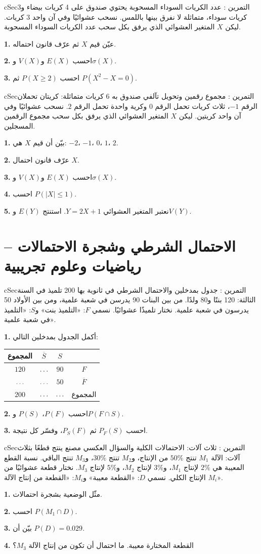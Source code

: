 \documentclass[12pt,a4paper]{article}
\newenvironment{BOX}[2]{\begin{otherlanguage}{english}\begin{arbox}{#1}{#2}}{\end{arbox}\end{otherlanguage}}
\newcounter{exo}
\newenvironment{tamrin}[1]{\stepcounter{exo}\begin{BOX}{cSec}{التمرين \theexo: #1}}{\end{BOX}}
\renewcommand{\ldots}{\mathinner{\ldotp\ldotp\ldotp}}
\newcommand{\QQ}[1]{\par\smallskip\textbf{#1.} }
\begin{document}
\begin{tamrin}{عدد الكريات السوداء المسحوبة}
يحتوي صندوق على 4 كريات بيضاء و3 كريات سوداء، متماثلة لا نفرق بينها باللمس. نسحب عشوائيًا وفي آن واحد 3 كريات. ليكن $X$ المتغير العشوائي الذي يرفق بكل سحب عدد الكريات السوداء المسحوبة.
\QQ{1} عيّن قيم $X$ ثم عرّف قانون احتماله.
\QQ{2} احسب $E(X)$ و$V(X)$ و$\sigma(X)$.
\QQ{3} احسب $P(X\geqslant2)$ ثم $P(X^2-X=0)$.
\end{tamrin}

\begin{tamrin}{مجموع رقمين وتحويل تآلفي}
صندوق به 6 كريات متماثلة: كريتان تحملان الرقم $-1$، ثلاث كريات تحمل الرقم $0$ وكرية واحدة تحمل الرقم $2$. نسحب عشوائيًا وفي آن واحد كريتين. ليكن $X$ المتغير العشوائي الذي يرفق بكل سحب مجموع الرقمين المسجلين.
\QQ{1} بيّن أن قيم $X$ هي: $-2$، $-1$، $0$، $1$، $2$.
\QQ{2} عرّف قانون احتمال $X$.
\QQ{3} احسب $E(X)$ و$V(X)$ و$\sigma(X)$.
\QQ{4} احسب $P(|X|\leqslant1)$.
\QQ{5} نعتبر المتغير العشوائي $Y=2X+1$. استنتج $E(Y)$ و$V(Y)$.
\end{tamrin}

\section{الاحتمال الشرطي وشجرة الاحتمالات -- رياضيات وعلوم تجريبية}

\begin{tamrin}{جدول بمدخلين والاحتمال الشرطي}
في ثانوية بها 200 تلميذ في السنة الثالثة: 120 بنتًا و80 ولدًا. من بين البنات 90 يدرسن في شعبة علمية، ومن بين الأولاد 50 يدرسون في شعبة علمية. نختار تلميذًا عشوائيًا. نسمي $F$: «التلميذ بنت» و$S$: «التلميذ في شعبة علمية».
\QQ{1} أكمل الجدول بمدخلين التالي:
\begin{center}
\begin{tabular}{|C|C|C|C|}\hline
{} المجموع & $\overline{S}$ & $S$ & \\\hline
$120$ & $\ldots$ & $90$ & $F$\\\hline
$\ldots$ & $\ldots$ & $50$ & $\overline{F}$\\\hline
$200$ & $\ldots$ & $\ldots$ & المجموع\\\hline
\end{tabular}
\end{center}
\QQ{2} احسب $P(F)$، $P(S)$ و$P(F\cap S)$.
\QQ{3} احسب $P_F(S)$ ثم $P_S(F)$، وفسّر كل نتيجة.
\end{tamrin}

\begin{tamrin}{ثلاث آلات: الاحتمالات الكلية والسؤال العكسي}
مصنع ينتج قطعًا بثلاث آلات: الآلة $M_1$ تنتج $50\%$ من الإنتاج، و$M_2$ تنتج $30\%$، و$M_3$ تنتج الباقي. نسبة القطع المعيبة هي $2\%$ لإنتاج $M_1$، و$3\%$ لإنتاج $M_2$، و$5\%$ لإنتاج $M_3$. نختار قطعة عشوائيًا من الإنتاج الكلي. نسمي $D$: «القطعة معيبة» و$M_i$: «القطعة من إنتاج الآلة $M_i$».
\QQ{1} مثّل الوضعية بشجرة احتمالات.
\QQ{2} احسب $P(M_1\cap D)$.
\QQ{3} بيّن أن $P(D)=0.029$.
\QQ{4} القطعة المختارة معيبة. ما احتمال أن تكون من إنتاج الآلة $M_3$؟
\end{tamrin}
\end{document}
